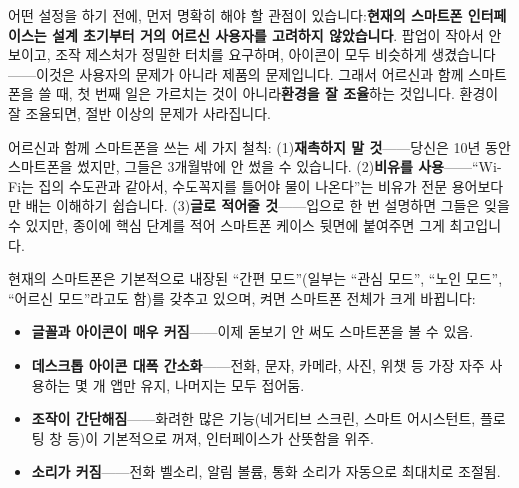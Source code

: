 


어떤 설정을 하기 전에, 먼저 명확히 해야 할 관점이 있습니다:\textbf{현재의 스마트폰 인터페이스는 설계 초기부터 거의 어르신 사용자를 고려하지 않았습니다}. 팝업이 작아서 안 보이고, 조작 제스처가 정밀한 터치를 요구하며, 아이콘이 모두 비슷하게 생겼습니다——이것은 사용자의 문제가 아니라 제품의 문제입니다. 그래서 어르신과 함께 스마트폰을 쓸 때, 첫 번째 일은 가르치는 것이 아니라\textbf{환경을 잘 조율}하는 것입니다. 환경이 잘 조율되면, 절반 이상의 문제가 사라집니다.

어르신과 함께 스마트폰을 쓰는 세 가지 철칙: (1)\textbf{재촉하지 말 것}——당신은 10년 동안 스마트폰을 썼지만, 그들은 3개월밖에 안 썼을 수 있습니다. (2)\textbf{비유를 사용}——“Wi-Fi는 집의 수도관과 같아서, 수도꼭지를 틀어야 물이 나온다”는 비유가 전문 용어보다 만 배는 이해하기 쉽습니다. (3)\textbf{글로 적어줄 것}——입으로 한 번 설명하면 그들은 잊을 수 있지만, 종이에 핵심 단계를 적어 스마트폰 케이스 뒷면에 붙여주면 그게 최고입니다.


현재의 스마트폰은 기본적으로 내장된 “간편 모드”(일부는 “관심 모드”, “노인 모드”, “어르신 모드”라고도 함)를 갖추고 있으며, 켜면 스마트폰 전체가 크게 바뀝니다:

\begin{itemize}
  \item \textbf{글꼴과 아이콘이 매우 커짐}——이제 돋보기 안 써도 스마트폰을 볼 수 있음.
  \item \textbf{데스크톱 아이콘 대폭 간소화}——전화, 문자, 카메라, 사진, 위챗 등 가장 자주 사용하는 몇 개 앱만 유지, 나머지는 모두 접어둠.
  \item \textbf{조작이 간단해짐}——화려한 많은 기능(네거티브 스크린, 스마트 어시스턴트, 플로팅 창 등)이 기본적으로 꺼져, 인터페이스가 산뜻함을 위주.
  \item \textbf{소리가 커짐}——전화 벨소리, 알림 볼륨, 통화 소리가 자동으로 최대치로 조절됨.
\end{itemize}

